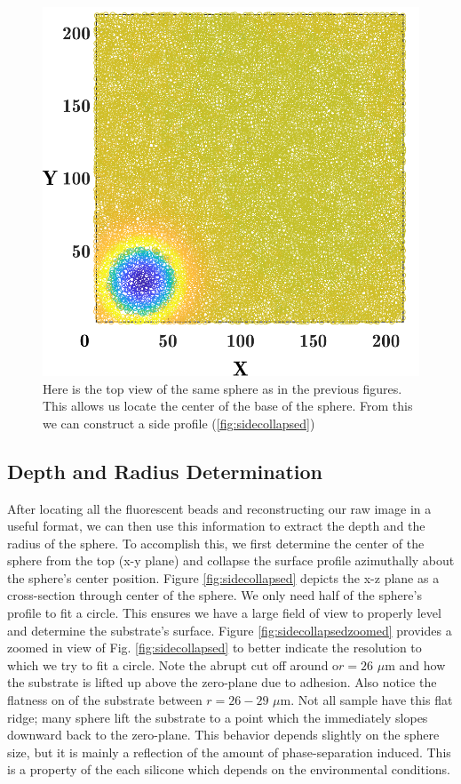 \begin{figure}[h]
	\centering
	\includegraphics[width=.8\linewidth]{Chapters/Figures/sphere011_ia/particle_located_top_view}
	\caption[Particle Located: Top View]{Here is the top view of the same sphere as in the previous figures. This allows us locate the center of the base of the sphere. From this we can construct a side profile (\ref{fig:sidecollapsed})}
	\label{fig:particlelocatedtopview}
\end{figure}
\subsection{Depth and Radius Determination}
After locating all the fluorescent beads and reconstructing our raw image in a useful format, we can then use this information to extract the depth and the radius of the sphere. To accomplish this, we first determine the center of the sphere from the top (x-y plane) and collapse the surface profile azimuthally about the sphere's center position. Figure \ref{fig:sidecollapsed} depicts the x-z plane as a cross-section through center of the sphere. We only need half of the sphere's profile to fit a circle. This ensures we have a large field of view to properly level and determine the substrate's surface. Figure \ref{fig:sidecollapsedzoomed} provides a zoomed in view of Fig. \ref{fig:sidecollapsed} to better indicate the resolution to which we try to fit a circle. Note the abrupt cut off around o$r = 26$ $ \mu$m and how the substrate is lifted up above the zero-plane due to adhesion. Also notice the flatness on of the substrate between $r= 26-29$ $\mu $m. Not all sample have this flat ridge; many sphere lift the substrate to a point which the immediately slopes downward back to the zero-plane. This behavior depends slightly on the sphere size, but it is mainly a reflection of the amount of phase-separation induced. This is a property of the each silicone which depends on the environmental conditions. 


